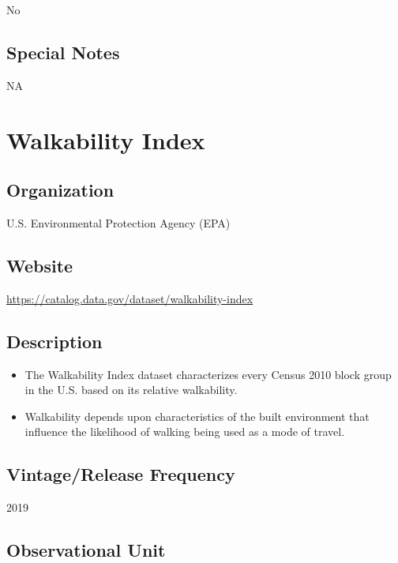 \documentclass[
]{book}
\providecommand{\tightlist}{%
  \setlength{\itemsep}{0pt}\setlength{\parskip}{0pt}}
\begin{document}
No

\hypertarget{special-notes-96}{%
\section{Special Notes}\label{special-notes-96}}

NA

\mainmatter

\hypertarget{walkability-index}{%
\chapter{Walkability Index}\label{walkability-index}}

\hypertarget{organization-97}{%
\section{Organization}\label{organization-97}}

U.S. Environmental Protection Agency (EPA)

\hypertarget{website-97}{%
\section{Website}\label{website-97}}

\url{https://catalog.data.gov/dataset/walkability-index}

\hypertarget{description-97}{%
\section{Description}\label{description-97}}

\begin{itemize}
\tightlist
\item
  The Walkability Index dataset characterizes every Census 2010 block group in the U.S. based on its relative walkability.
\item
  Walkability depends upon characteristics of the built environment that influence the likelihood of walking being used as a mode of travel.
\end{itemize}

\hypertarget{vintagerelease-frequency-97}{%
\section{Vintage/Release Frequency}\label{vintagerelease-frequency-97}}

2019

\hypertarget{observational-unit-97}{%
\section{Observational Unit}\label{observational-unit-97}}
\end{document}
